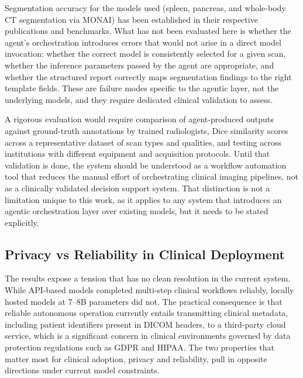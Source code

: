 \documentclass[conference]{IEEEtran}
\begin{document}
Segmentation accuracy for the models used (spleen, pancreas, and whole-body CT segmentation via MONAI) has been established in their respective publications and benchmarks. What has not been evaluated here is whether the agent's orchestration introduces errors that would not arise in a direct model invocation: whether the correct model is consistently selected for a given scan, whether the inference parameters passed by the agent are appropriate, and whether the structured report correctly maps segmentation findings to the right template fields. These are failure modes specific to the agentic layer, not the underlying models, and they require dedicated clinical validation to assess.

A rigorous evaluation would require comparison of agent-produced outputs against ground-truth annotations by trained radiologists, Dice similarity scores across a representative dataset of scan types and qualities, and testing across institutions with different equipment and acquisition protocols. Until that validation is done, the system should be understood as a workflow automation tool that reduces the manual effort of orchestrating clinical imaging pipelines, not as a clinically validated decision support system. That distinction is not a limitation unique to this work, as it applies to any system that introduces an agentic orchestration layer over existing models, but it needs to be stated explicitly.

\subsection{Privacy vs Reliability in Clinical Deployment}

The results expose a tension that has no clean resolution in the current system. While API-based models completed multi-step clinical workflows reliably, locally hosted models at 7--8B parameters did not. The practical consequence is that reliable autonomous operation currently entails transmitting clinical metadata, including patient identifiers present in DICOM headers, to a third-party cloud service, which is a significant concern in clinical environments governed by data protection regulations such as GDPR and HIPAA. The two properties that matter most for clinical adoption, privacy and reliability, pull in opposite directions under current model constraints.
\end{document}
